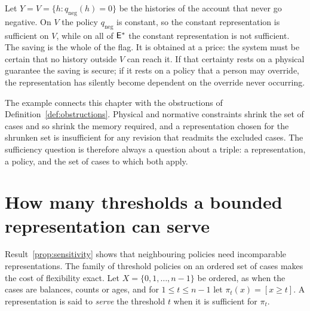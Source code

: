 \begin{example}\label{ex:domain-account}
Let $Y=V=\{h:q_{\mathrm{neg}}(h)=0\}$ be the histories of the account that never go negative. On $V$ the policy $q_{\mathrm{neg}}$ is constant, so the constant representation is sufficient on $V$, while on all of $\mathsf{E}^{*}$ the constant representation is not sufficient. The saving is the whole of the flag. It is obtained at a price: the system must be certain that no history outside $V$ can reach it. If that certainty rests on a physical guarantee the saving is secure; if it rests on a policy that a person may override, the representation has silently become dependent on the override never occurring.
\end{example}

The example connects this chapter with the obstructions of Definition~\ref{def:obstructions}. Physical and normative constraints shrink the set of cases and so shrink the memory required, and a representation chosen for the shrunken set is insufficient for any revision that readmits the excluded cases. The sufficiency question is therefore always a question about a triple: a representation, a policy, and the set of cases to which both apply.


\section{How many thresholds a bounded representation can serve}\label{sec:thresholds-served}

Result~\ref{prop:sensitivity} shows that neighbouring policies need incomparable representations. The family of threshold policies on an ordered set of cases makes the cost of flexibility exact. Let $X=\{0,1,\dots,n-1\}$ be ordered, as when the cases are balances, counts or ages, and for $1\le t\le n-1$ let $\pi_t(x)=[x\ge t]$. A representation is said to \emph{serve} the threshold $t$ when it is sufficient for $\pi_t$.


